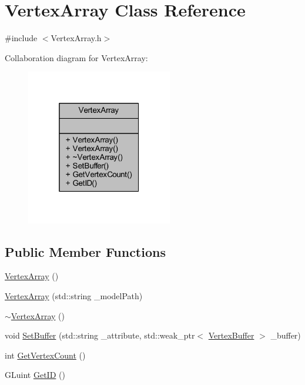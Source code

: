 \hypertarget{class_vertex_array}{}\section{Vertex\+Array Class Reference}
\label{class_vertex_array}


{\ttfamily \#include $<$Vertex\+Array.\+h$>$}



Collaboration diagram for Vertex\+Array\+:
\nopagebreak
\begin{figure}[H]
\begin{center}
\leavevmode
\includegraphics[width=181pt]{class_vertex_array__coll__graph}
\end{center}
\end{figure}
\subsection*{Public Member Functions}
\begin{DoxyCompactItemize}
\item 
\mbox{\hyperlink{class_vertex_array_ab8a2dcce9698f96dac5f9a19c6979d03}{Vertex\+Array}} ()
\item 
\mbox{\hyperlink{class_vertex_array_acaa825f36ff34944a77d27717c243fab}{Vertex\+Array}} (std\+::string \+\_\+model\+Path)
\item 
\mbox{\hyperlink{class_vertex_array_a82597eb9daba5ad66dd3cf898e159a95}{$\sim$\+Vertex\+Array}} ()
\item 
void \mbox{\hyperlink{class_vertex_array_a35c33c02c2dfd594e36a2a96154b4f89}{Set\+Buffer}} (std\+::string \+\_\+attribute, std\+::weak\+\_\+ptr$<$ \mbox{\hyperlink{class_vertex_buffer}{Vertex\+Buffer}} $>$ \+\_\+buffer)
\item 
int \mbox{\hyperlink{class_vertex_array_a94f9ebffa24c5721783099fef186f9a0}{Get\+Vertex\+Count}} ()
\item 
G\+Luint \mbox{\hyperlink{class_vertex_array_ab5d3887c2b7ab5fa779cda481f776c98}{Get\+ID}} ()
\end{DoxyCompactItemize}


